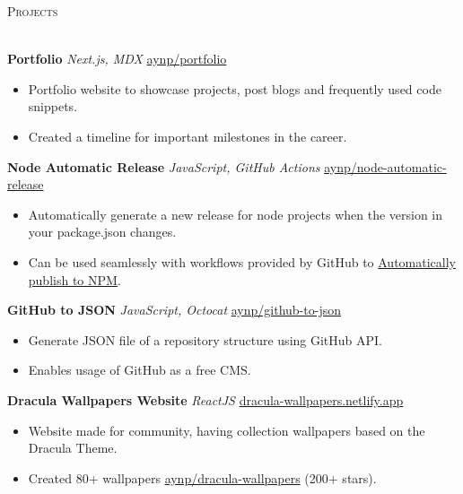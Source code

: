 \documentclass[a4paper]{article}
\newcommand{\lineunder} {
    \vspace*{-8pt} \\
    \hspace*{-18pt} \hrulefill \\
}
\newcommand{\header} [1] {
    {\hspace*{-18pt}\vspace*{6pt} \textsc{#1}}
    \vspace*{-6pt} \lineunder
}
\begin{document}

\header{Projects}
\vspace{1mm}

{\textbf{Portfolio}} {\sl Next.js, MDX} \hfill \href{https://github.com/aynp/portfolio}{aynp/portfolio}\\
\begin{itemize}
	\item Portfolio website to showcase projects, post blogs and frequently used code snippets.
	\item Created a timeline for important milestones in the career.
\end{itemize}
\vspace*{1.5mm}

{\textbf{Node Automatic Release}} {\sl JavaScript, GitHub Actions} \hfill \href{https://github.com/aynp/node-automatic-release}{aynp/node-automatic-release}\\
\begin{itemize}
	\item Automatically generate a new release for node projects when the version in your package.json changes.
	\item Can be used seamlessly with workflows provided by GitHub to \href{https://aryanpathania.vercel.app/blog/automatic-npm-publish}{Automatically publish to NPM}.
\end{itemize}
\vspace*{1.5mm}

{\textbf{GitHub to JSON}} {\sl JavaScript, Octocat} \hfill \href{https://github.com/aynp/github-to-json}{aynp/github-to-json}\\
\begin{itemize}
	\item Generate JSON file of a repository structure using GitHub API.
	\item Enables usage of GitHub as a free CMS.
\end{itemize}
\vspace*{1.5mm}

{\textbf{Dracula Wallpapers Website}} {\sl ReactJS} \hfill \href{https://dracula-wallpapers.netlify.app/}{dracula-wallpapers.netlify.app}\\
\begin{itemize}
	\item Website made for community, having collection wallpapers based on the Dracula Theme.
	\item Created 80+ wallpapers \href{https://github.com/aynp/dracula-wallpapers}{aynp/dracula-wallpapers} (200+ stars).
\end{itemize}
\vspace*{1.5mm}
\end{document}
